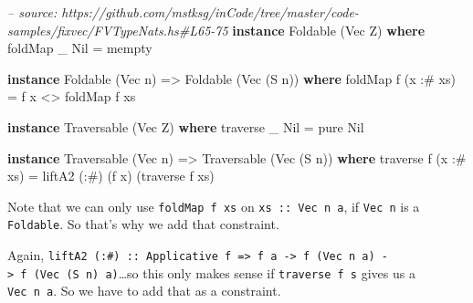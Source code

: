 \documentclass[]{article}
\newenvironment{Shaded}{}{}
\newcommand{\KeywordTok}[1]{\textcolor[rgb]{0.00,0.44,0.13}{\textbf{{#1}}}}
\newcommand{\DataTypeTok}[1]{\textcolor[rgb]{0.56,0.13,0.00}{{#1}}}
\newcommand{\CommentTok}[1]{\textcolor[rgb]{0.38,0.63,0.69}{\textit{{#1}}}}
\newcommand{\OtherTok}[1]{\textcolor[rgb]{0.00,0.44,0.13}{{#1}}}
\newcommand{\FunctionTok}[1]{\textcolor[rgb]{0.02,0.16,0.49}{{#1}}}
\newcommand{\NormalTok}[1]{{#1}}
\begin{document}
\begin{Shaded}
\begin{Highlighting}[]
\CommentTok{-- source: https://github.com/mstksg/inCode/tree/master/code-samples/fixvec/FVTypeNats.hs#L65-75}
\KeywordTok{instance} \DataTypeTok{Foldable} \NormalTok{(}\DataTypeTok{Vec} \DataTypeTok{Z}\NormalTok{) }\KeywordTok{where}
    \NormalTok{foldMap _ }\DataTypeTok{Nil} \FunctionTok{=} \NormalTok{mempty}

\KeywordTok{instance} \DataTypeTok{Foldable} \NormalTok{(}\DataTypeTok{Vec} \NormalTok{n) }\OtherTok{=>} \DataTypeTok{Foldable} \NormalTok{(}\DataTypeTok{Vec} \NormalTok{(}\DataTypeTok{S} \NormalTok{n)) }\KeywordTok{where}
    \NormalTok{foldMap f (x }\FunctionTok{:#} \NormalTok{xs) }\FunctionTok{=} \NormalTok{f x }\FunctionTok{<>} \NormalTok{foldMap f xs}

\KeywordTok{instance} \DataTypeTok{Traversable} \NormalTok{(}\DataTypeTok{Vec} \DataTypeTok{Z}\NormalTok{) }\KeywordTok{where}
    \NormalTok{traverse _ }\DataTypeTok{Nil} \FunctionTok{=} \NormalTok{pure }\DataTypeTok{Nil}

\KeywordTok{instance} \DataTypeTok{Traversable} \NormalTok{(}\DataTypeTok{Vec} \NormalTok{n) }\OtherTok{=>} \DataTypeTok{Traversable} \NormalTok{(}\DataTypeTok{Vec} \NormalTok{(}\DataTypeTok{S} \NormalTok{n)) }\KeywordTok{where}
    \NormalTok{traverse f (x }\FunctionTok{:#} \NormalTok{xs) }\FunctionTok{=} \NormalTok{liftA2 (}\FunctionTok{:#}\NormalTok{) (f x) (traverse f xs)}
\end{Highlighting}
\end{Shaded}

Note that we can only use \texttt{foldMap\ f\ xs} on
\texttt{xs\ ::\ Vec\ n\ a}, if \texttt{Vec\ n} is a \texttt{Foldable}.
So that's why we add that constraint.

Again,
\texttt{liftA2\ (:\#)\ ::\ Applicative\ f\ =\textgreater{}\ f\ a\ -\textgreater{}\ f\ (Vec\ n\ a)\ -\textgreater{}\ f\ (Vec\ (S\ n)\ a)}\ldots{}so
this only makes sense if \texttt{traverse\ f\ s} gives us a
\texttt{Vec\ n\ a}. So we have to add that as a constraint.
\end{document}
